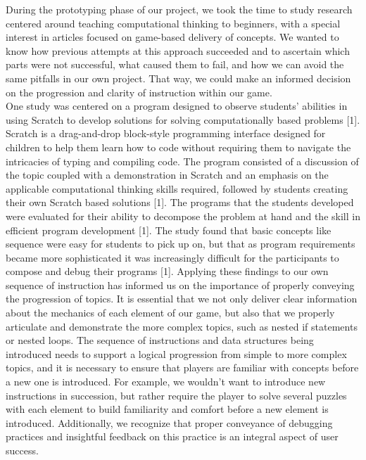 During the prototyping phase of our project, we took the time to study research
centered around teaching computational thinking to beginners, with a special
interest in articles focused on game-based delivery of concepts. We wanted to
know how previous attempts at this approach succeeded and to ascertain which
parts were not successful, what caused them to fail, and how we can avoid the
same pitfalls in our own project. That way, we could make an informed decision
on the progression and clarity of instruction within our game.\\

One study was centered on a program designed to observe students’ abilities in
using Scratch to develop solutions for solving computationally based problems
[1]. Scratch is a drag-and-drop block-style programming interface designed for
children to help them learn how to code without requiring them to navigate the
intricacies of typing and compiling code. The program consisted of a discussion
of the topic coupled with a demonstration in Scratch and an emphasis on the
applicable computational thinking skills required, followed by students creating
their own Scratch based solutions [1]. The programs that the students developed
were evaluated for their ability to decompose the problem at hand and the skill
in efficient program development [1]. The study found that basic concepts like
sequence were easy for students to pick up on, but that as program requirements
became more sophisticated it was increasingly difficult for the participants to
compose and debug their programs [1]. Applying these findings to our own
sequence of instruction has informed us on the importance of properly conveying
the progression of topics. It is essential that we not only deliver clear
information about the mechanics of each element of our game, but also that we
properly articulate and demonstrate the more complex topics, such as nested if
statements or nested loops. The sequence of instructions and data structures
being introduced needs to support a logical progression from simple to more
complex topics, and it is necessary to ensure that players are familiar with
concepts before a new one is introduced. For example, we wouldn’t want to
introduce new instructions in succession, but rather require the player to solve
several puzzles with each element to build familiarity and comfort before a new
element is introduced.  Additionally, we recognize that proper conveyance of
debugging practices and insightful feedback on this practice is an integral
aspect of user success.\\

